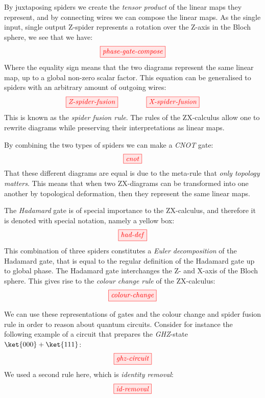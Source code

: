 \documentclass[a4paper, 12pt]{article}
\begin{document}
By juxtaposing spiders we create the \emph{tensor product} of the linear maps they represent, and by connecting wires we can compose the linear maps. As the single input, single output Z-spider represents a rotation over the Z-axis in the Bloch sphere, we see that we have:
\begin{equation*}
    \tikzfig{phase-gate-compose}
\end{equation*}
Where the equality sign means that the two diagrams represent the same linear map, up to a global non-zero scalar factor. This equation can be generalised to spiders with an arbitrary amount of outgoing wires:
\begin{equation*}
    \tikzfig{Z-spider-fusion} \qquad\qquad \tikzfig{X-spider-fusion}
\end{equation*}
This is known as the \emph{spider fusion rule}. The rules of the ZX-calculus allow one to rewrite diagrams while preserving their interpretations as linear maps.

By combining the two types of spiders we can make a \emph{CNOT} gate:
\begin{equation*}
    \tikzfig{cnot}
\end{equation*}
That these different diagrams are equal is due to the meta-rule that \emph{only topology matters}. This means that when two ZX-diagrams can be transformed into one another by topological deformation, then they represent the same linear maps.

The \emph{Hadamard} gate is of special importance to the ZX-calculus, and therefore it is denoted with special notation, namely a yellow box:
\begin{equation*}
    \tikzfig{had-def}
\end{equation*}
This combination of three spiders constitutes a \emph{Euler decomposition} of the Hadamard gate, that is equal to the regular definition of the Hadamard gate up to global phase. The Hadamard gate interchanges the Z- and X-axis of the Bloch sphere. This gives rise to the \emph{colour change rule} of the ZX-calculus:
\begin{equation*}
    \tikzfig{colour-change}
\end{equation*}

We can use these representations of gates and the colour change and spider fusion rule in order to reason about quantum circuits. Consider for instance the following example of a circuit that prepares the \emph{GHZ}-state $\ket{000}+\ket{111}$:
\begin{equation*}
    \tikzfig{ghz-circuit}
\end{equation*}
We used a second rule here, which is \emph{identity removal}:
\begin{equation*}
    \tikzfig{id-removal}
\end{equation*}
\end{document}
